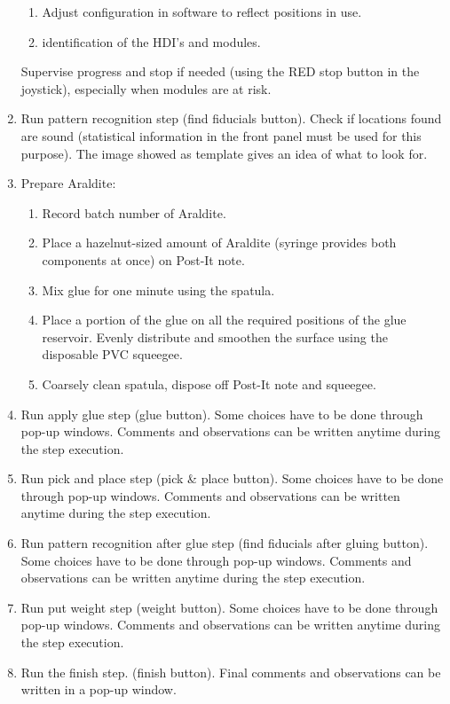 \documentclass[12pt]{unlsilabsop}
\begin{document}
\begin{enumerate}
    \begin{enumerate}
        \item Adjust configuration in software to reflect positions in use.
        \item identification of the HDI's and modules.
    \end{enumerate}
    Supervise progress and stop if needed (using the RED stop button in the joystick), especially when modules are at risk.
    \item Run pattern recognition step (find fiducials button). Check if locations found are sound (statistical information in the front panel must be used for this purpose). The image showed as template gives an idea of what to look for. 
    \item Prepare Araldite:
    \begin{enumerate}
        \item Record batch number of Araldite.
        \item Place a hazelnut-sized amount of Araldite (syringe provides both components at once) on Post-It note.
        \item Mix glue for one minute using the spatula.
        \item Place a portion of the glue on all the required positions of the glue reservoir. Evenly distribute and smoothen the surface using the disposable PVC squeegee.
        \item Coarsely clean spatula, dispose off Post-It note and squeegee.
    \end{enumerate}
    \item Run apply glue step (glue button). Some choices have to be done through pop-up windows. Comments and observations can be written anytime during the step execution.
    \item Run pick and place step (pick \& place button). Some choices have to be done through pop-up windows. Comments and observations can be written anytime during the step execution.
    \item Run pattern recognition after glue step (find fiducials after gluing button). Some choices have to be done through pop-up windows. Comments and observations can be written anytime during the step execution.
    \item Run put weight step (weight button). Some choices have to be done through pop-up windows. Comments and observations can be written anytime during the step execution.
    \item Run the finish step. (finish button). Final comments and observations can be written in a pop-up window.

\end{enumerate}
\end{document}
